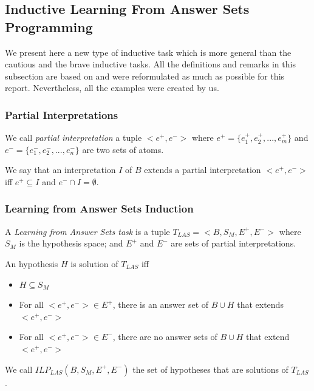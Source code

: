 
\subsection{Inductive Learning From Answer Sets Programming}

We present here a new type of inductive task which is more general than the cautious and the brave inductive tasks. All the definitions and remarks in this subsection are based on \citep{law2014inductive, law2015weak, law2016context} and were reformulated as much as possible for this report. Nevertheless, all the examples were created by us.

\subsubsection{Partial Interpretations}

\begin{definition}
We call \textit{partial interpretation} a tuple $<e^+,e^->$ where $e^+=\{e^+_1,e^+_2,...,e^+_m\}$ and $e^-=\{e^-_1,e^-_2,...,e^-_n\}$ are two sets of atoms. 

\smallskip

We say that an interpretation $I$ of $B$ extends a partial interpretation $<e^+,e^->$ iff $e^+ \subseteq I$ and $e^- \cap I = \emptyset$.
\end{definition}

\subsubsection{Learning from Answer Sets Induction}

\begin{definition}

A \textit{Learning from Answer Sets task} is a tuple $T_{LAS}=<B, S_M, E^+, E^->$ where $S_M$ is the hypothesis space; and $E^+$ and $E^-$ are sets of partial interpretations. 

\smallskip

An hypothesis $H$ is solution of $T_{LAS}$ iff 
\begin{itemize}
\item $H\subseteq S_M$
\item For all  $<e^+,e^->\in E^+$, there is an answer set of $B\cup H$ that extends $<e^+,e^->$
\item For all  $<e^+,e^->\in E^-$, there are no answer sets of $B\cup H$ that extend $<e^+,e^->$
\end{itemize}

We call $ILP_{LAS}(B,S_M,E^+,E^-)$ the set of hypotheses that are solutions of $T_{LAS}$. 
\end{definition}

